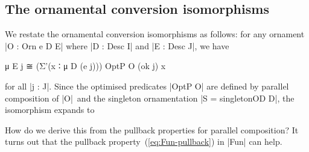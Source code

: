 \subsection{The ornamental conversion isomorphisms}
\label{sec:ornamental-conversion-isomorphisms}

We restate the ornamental conversion isomorphisms as follows: for any ornament |O : Orn e D E| where |D : Desc I| and |E : Desc J|, we have
\begin{code}
μ E j ≅ (Σ'(x ∶ μ D (e j))) OptP O (ok j) x
\end{code}
for all |j : J|.
Since the optimised predicates |OptP O| are defined by parallel composition of |O|~and the singleton ornamentation |S = singletonOD D|, the isomorphism expands to
How do we derive this from the pullback properties for parallel composition?
It turns out that the pullback property~(\ref{eq:Fun-pullback}) in |Fun| can help.


